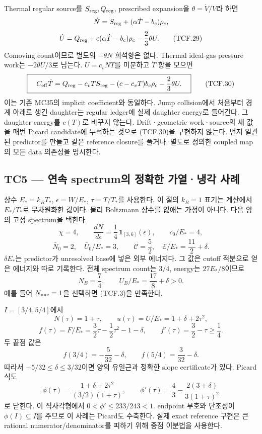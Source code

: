 Thermal regular source를 \(S_{\rm reg},Q_{\rm reg}\), prescribed expansion을 \(\theta=\dot V/V\)라 하면 \[
\dot N=S_{\rm reg}+(\alpha\dot T-b_c)\rho_c,
\] \[
\dot U=Q_{\rm reg}+c(\alpha\dot T-b_c)\rho_c
-\frac23\theta U.
\tag{TCF.29}
\] Comoving count이므로 별도의 \(-\theta N\) 희석항은 없다. Thermal ideal-gas pressure work는 \(-2\theta U/3\)로 남는다. \(U=c_vNT\)를 미분하고 \(\dot T\) 항을 모으면 \[
\boxed{\quad
C_{\rm eff}\dot T=
Q_{\rm reg}-c_vTS_{\rm reg}
-(c-c_vT)b_c\rho_c-\frac23\theta U .
\quad}
\tag{TCF.30}
\] 이는 기존 MC35의 implicit coefficient와 동일하다. Jump collision에서 처음부터 경계 아래로 생긴 daughter는 regular ledger에 실제 daughter energy로 들어간다. 그 daughter energy를 \(c(T)\)로 바꾸지 않는다. Drift·geometric work·source의 새 값을 매번 Picard candidate에 누적하는 것으로 (TCF.30)을 구현하지 않는다. 먼저 일관된 predictor를 만들고 같은 reference closure를 풀거나, 별도로 정의한 coupled map의 모든 data 의존성을 명시한다.

\hypertarget{tc5-uxc5f0uxc18d-spectrumuxc758-uxc815uxd655uxd55c-uxac00uxc5f4uxb0c9uxac01-uxc0acuxb840}{%
\subsection{TC5 --- 연속 spectrum의 정확한 가열·냉각 사례}\label{tc5-uxc5f0uxc18d-spectrumuxc758-uxc815uxd655uxd55c-uxac00uxc5f4uxb0c9uxac01-uxc0acuxb840}}

상수 \(E_*=k_BT_*\), \(\epsilon=W/E_*\), \(\tau=T/T_*\)를 사용한다. 이 절의 \(k_B=1\) 표기는 계산에서 \(E_*/T_*\)로 무차원화한 값이다. 물리 Boltzmann 상수를 없애는 가정이 아니다. 다음 양의 고정 spectrum을 택한다. \[
\chi=4,\qquad
\frac{dN}{d\epsilon}=\frac14\,\mathbf1_{[3,6]}(\epsilon),\qquad
c_0/E_*=4,
\] \[
\bar N_0=2,\quad \bar U_0/E_*=3,\qquad
\mathscr C=\frac52,\quad
\mathscr E/E_*=\frac{11}{2}+\delta .
\tag{TCF.31}
\] \(\delta E_*\)는 predictor가 unresolved base에 넣은 외부 에너지다. 그 값은 cutoff 적분으로 얻은 에너지와 따로 기록한다. 전체 spectrum count는 \(3/4\), energy는 \(27E_*/8\)이므로 \[
N_B=\frac74,\qquad U_B/E_*=\frac{17}{8}+\delta>0 .
\tag{TCF.32}
\] 예를 들어 \(N_{\rm nuc}=1\)을 선택하면 (TCF.3)을 만족한다.

\(I=[3/4,5/4]\)에서 \[
N(\tau)=1+\tau,\qquad u(\tau)=U/E_*=1+\delta+2\tau^2,
\] \[
f(\tau)=F/E_*=
\frac32\tau-\frac12\tau^2-1-\delta,\qquad
f'(\tau)=\frac32-\tau\ge\frac14.
\tag{TCF.33}
\] 두 끝점 값은 \[
f(3/4)=-\frac5{32}-\delta,\qquad
f(5/4)=\frac3{32}-\delta .
\tag{TCF.34}
\] 따라서 \(-5/32\le\delta\le3/32\)이면 양의 유일근과 정확한 slope certificate가 있다. Picard 식도 \[
\phi(\tau)=\frac{1+\delta+2\tau^2}{(3/2)(1+\tau)},\qquad
\phi'(\tau)=\frac43-\frac{2(3+\delta)}{3(1+\tau)^2}
\tag{TCF.35}
\] 로 닫힌다. 이 직사각형에서 \(0<\phi'\le233/243<1\). endpoint 부호와 단조성이 \(\phi(I)\subseteq I\)를 주므로 이 사례는 Picard도 수축한다. 실제 exact reference 구현은 큰 rational numerator/denominator를 피하기 위해 중점 이분법을 사용한다.

